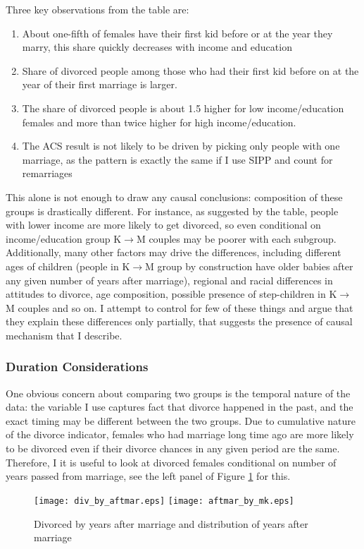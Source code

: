 \documentclass[12pt,letter]{article}
\begin{document}
Three key observations from the table are:
\begin{enumerate}
\item About one-fifth of females have their first kid before or at the year they marry, this share quickly decreases with income and education
\item Share of divorced people among those who had their first kid before on at the year of their first marriage is larger.
\item The share of divorced people is about 1.5 higher for low income/education females and more than twice higher for high income/education.
\item The ACS result is not likely to be driven by picking only people with one marriage, as the pattern is exactly the same if I use SIPP and count for remarriages
\end{enumerate}

This alone is not enough to draw any causal conclusions: composition of these groups is drastically different. For instance, as suggested by the table, people with lower income are more likely to get divorced, so even conditional on income/education group K$\to$M couples may be poorer with each subgroup. Additionally, many other factors may drive the differences, including different ages of children (people in K$\to$M group by construction have older babies after any given number of years after marriage), regional and racial differences in attitudes to divorce, age composition, possible presence of step-children in K$\to$M couples and so on. I attempt to control for few of these things and argue that they explain these differences only partially, that suggests the presence of causal mechanism that I describe.

\subsubsection{Duration Considerations}
One obvious concern about comparing two groups is the temporal nature of the data: the variable I use captures fact that divorce happened in the past, and the exact timing may be different between the two groups. Due to cumulative nature of the divorce indicator, females who had marriage long time ago are more likely to be divorced even if their divorce chances in any given period are the same. Therefore, I it is useful to look at divorced females conditional on number of years passed from marriage, see the left panel of Figure \ref{pic-aftmar} for this.
\begin{figure}[h!]
\texttt{[image: div\_by\_aftmar.eps]}
\texttt{[image: aftmar\_by\_mk.eps]}
\caption{Divorced by years after marriage and distribution of years after marriage\label{pic-aftmar}}
\end{figure}
\end{document}
